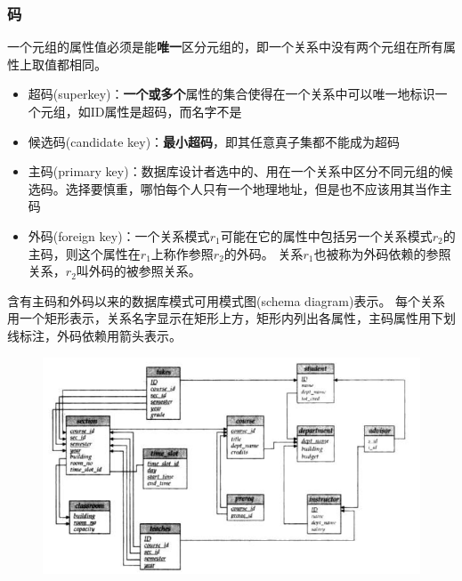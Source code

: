 \subsubsection{码}
一个元组的属性值必须是能\textbf{唯一}区分元组的，即一个关系中没有两个元组在所有属性上取值都相同。
\begin{itemize}
\item 超码(superkey)：\textbf{一个或多个}属性的集合使得在一个关系中可以唯一地标识一个元组，如ID属性是超码，而名字不是
\item 候选码(candidate key)：\textbf{最小超码}，即其任意真子集都不能成为超码
\item 主码(primary key)：数据库设计者选中的、用在一个关系中区分不同元组的候选码。选择要慎重，哪怕每个人只有一个地理地址，但是也不应该用其当作主码
\item 外码(foreign key)：一个关系模式$r_1$可能在它的属性中包括另一个关系模式$r_2$的主码，则这个属性在$r_1$上称作参照$r_2$的外码。
关系$r_1$也被称为外码依赖的参照关系，$r_2$叫外码的被参照关系。
\end{itemize}

含有主码和外码以来的数据库模式可用模式图(schema diagram)表示。
每个关系用一个矩形表示，关系名字显示在矩形上方，矩形内列出各属性，主码属性用下划线标注，外码依赖用箭头表示。
\begin{figure}[H]
\centering
\includegraphics[width=0.8\linewidth]{fig/university_schema_diagram.png}
\end{figure}
